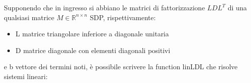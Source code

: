 \begin{flushleft}
Supponendo che in ingresso si abbiano le matrici di fattorizzazione $LDL^T$ di una qualsiasi matrice $M \in \mathbb{R}^{n\times n}$ SDP, rispettivamente:
\begin{itemize}
    \item L matrice triangolare inferiore a diagonale unitaria
    \item D matrice diagonale con elementi diagonali positivi
\end{itemize}
e b vettore dei termini noti, è possibile scrivere la function linLDL che risolve sistemi lineari:

\end{flushleft}